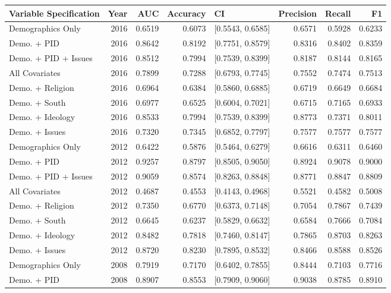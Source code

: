 \begin{longtable}{lrrrlrrr}
  \toprule
Variable Specification & Year & AUC & Accuracy & CI & Precision & Recall & F1 \\ 
  \midrule
Demographics Only & 2016 & 0.6519 & 0.6073 & [0.5543, 0.6585] & 0.6571 & 0.5928 & 0.6233 \\ 
  Demo. + PID & 2016 & 0.8642 & 0.8192 & [0.7751, 0.8579] & 0.8316 & 0.8402 & 0.8359 \\ 
  Demo. + PID + Issues & 2016 & 0.8512 & 0.7994 & [0.7539, 0.8399] & 0.8187 & 0.8144 & 0.8165 \\ 
  All Covariates & 2016 & 0.7899 & 0.7288 & [0.6793, 0.7745] & 0.7552 & 0.7474 & 0.7513 \\ 
  Demo. + Religion & 2016 & 0.6964 & 0.6384 & [0.5860, 0.6885] & 0.6719 & 0.6649 & 0.6684 \\ 
  Demo. + South & 2016 & 0.6977 & 0.6525 & [0.6004, 0.7021] & 0.6715 & 0.7165 & 0.6933 \\ 
  Demo. + Ideology & 2016 & 0.8533 & 0.7994 & [0.7539, 0.8399] & 0.8773 & 0.7371 & 0.8011 \\ 
  Demo. + Issues & 2016 & 0.7320 & 0.7345 & [0.6852, 0.7797] & 0.7577 & 0.7577 & 0.7577 \\ 
  Demographics Only & 2012 & 0.6422 & 0.5876 & [0.5464, 0.6279] & 0.6616 & 0.6311 & 0.6460 \\ 
  Demo. + PID & 2012 & 0.9257 & 0.8797 & [0.8505, 0.9050] & 0.8924 & 0.9078 & 0.9000 \\ 
  Demo. + PID + Issues & 2012 & 0.9059 & 0.8574 & [0.8263, 0.8848] & 0.8771 & 0.8847 & 0.8809 \\ 
  All Covariates & 2012 & 0.4687 & 0.4553 & [0.4143, 0.4968] & 0.5521 & 0.4582 & 0.5008 \\ 
  Demo. + Religion & 2012 & 0.7350 & 0.6770 & [0.6373, 0.7148] & 0.7054 & 0.7867 & 0.7439 \\ 
  Demo. + South & 2012 & 0.6645 & 0.6237 & [0.5829, 0.6632] & 0.6584 & 0.7666 & 0.7084 \\ 
  Demo. + Ideology & 2012 & 0.8482 & 0.7818 & [0.7460, 0.8147] & 0.7865 & 0.8703 & 0.8263 \\ 
  Demo. + Issues & 2012 & 0.8720 & 0.8230 & [0.7895, 0.8532] & 0.8466 & 0.8588 & 0.8526 \\ 
  Demographics Only & 2008 & 0.7919 & 0.7170 & [0.6402, 0.7855] & 0.8444 & 0.7103 & 0.7716 \\ 
  Demo. + PID & 2008 & 0.8907 & 0.8553 & [0.7909, 0.9060] & 0.9038 & 0.8785 & 0.8910 \\ 

\end{longtable}
